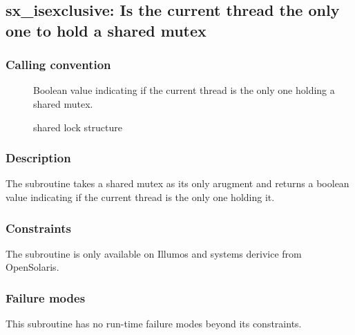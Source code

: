 \clearpage
{}
{}
\label{subr:sx-isexclusive}
\subsection*{sx\_isexclusive: Is the current thread the only one to
  hold a shared mutex }

\subsubsection*{Calling convention}

\begin{description}
\item[] Boolean value indicating if the current thread
  is the only one holding a shared mutex.
\item[] shared lock structure
\end{description}

\subsubsection*{Description}

The  subroutine takes a shared mutex as
its only arugment and returns a boolean value indicating if the
current thread is the only one holding it.

\subsubsection*{Constraints}

The  subroutine is only available on
Illumos and systems derivice from OpenSolaris.

\subsubsection*{Failure modes}

This subroutine has no run-time failure modes beyond its constraints.
